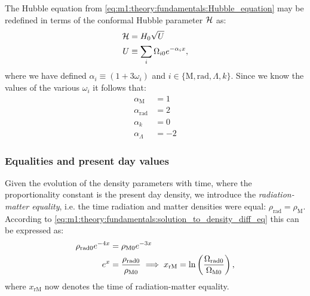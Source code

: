     The Hubble equation from \cref{eq:m1:theory:fundamentals:Hubble_equation} may be redefined in terms of the conformal Hubble parameter $\mathcal{H}$ as:
    \begin{equation}\label{eq:m1:lambdaCDM:conformal_Hubble_equation}
        \begin{split}
            \mathcal{H} &= H_0\sqrt{U}\\
            U &\equiv \sum_i\Omega_{i0}e^{-\alpha_ix}, 
        \end{split}
    \end{equation}
    where we have defined $\alpha_i\equiv(1+3\omega_i)$ and $i\in\{\mathrm{M}, \mathrm{rad}, \Lambda, k\}$. Since we know the values of the various $\omega_i$ it follows that:
    \begin{equation}
        \label{eq:m1:theory:lambdaCDM:alpha_values}
        \begin{split}
            \alpha_\mathrm{M} &= 1\\
            \alpha_\mathrm{rad} &= 2\\
            \alpha_k &= 0\\
            \alpha_\Lambda &= -2
        \end{split}
    \end{equation}

\subsubsection{Equalities and present day values}\label{sec:m1:theory:equalities}
     Given the evolution of the density parameters with time, where the proportionality constant is the present day density, we introduce the \textit{radiation-matter equality}, i.e. the time radiation and matter densities were equal: $\rho_\mathrm{rad}=\rho_\mathrm{M}$. According to \cref{eq:m1:theory:fundamentals:solution_to_density_diff_eq} this can be expressed as:
     \begin{equation}\label{eq:m1:theory:equalities:radiation_matter}
        \begin{split}
            \rho_\mathrm{rad0}e^{-4x} &= \rho_\mathrm{M0}e^{-3x} \\
            e^x &= \frac{\rho_\mathrm{rad0}}{\rho_\mathrm{M0}} \implies x_\mathrm{rM} = \ln\left(\frac{\Omega_\mathrm{rad0}}{\Omega_\mathrm{M0}}\right),
        \end{split}
     \end{equation}
     where $x_\mathrm{rM}$ now denotes the time of radiation-matter equality. 

